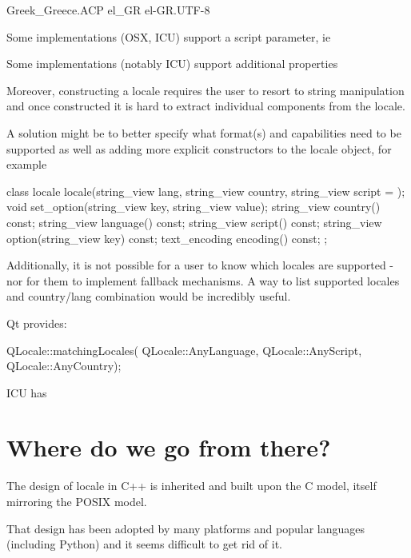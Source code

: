 \documentclass{wg21}
\begin{document}
\begin{codeblock}
Greek_Greece.ACP
el_GR
el-GR.UTF-8
\end{codeblock}

Some implementations (OSX, ICU) support a script parameter, ie 

Some implementations (notably ICU) support additional properties 


Moreover, constructing a locale requires the user to resort to string manipulation and once constructed it is hard to extract individual components from the locale.

A solution might be to better specify what format(s) and capabilities need to be supported as well as adding more explicit constructors to the locale object, for example


\begin{codeblock}

class locale {
    locale(string_view lang, string_view country, string_view script = {});
    void set_option(string_view key, string_view value);
    string_view country() const;
    string_view language() const;
    string_view script() const;
    string_view option(string_view key) const;
    text_encoding encoding() const;
};

\end{codeblock}

Additionally, it is not possible for a user to know which locales are supported - nor for them to implement fallback mechanisms.
A way to list supported locales and country/lang combination would be incredibly useful. 

Qt provides:

\begin{codeblock}
    QLocale::matchingLocales( QLocale::AnyLanguage, QLocale::AnyScript, QLocale::AnyCountry);
\end{codeblock}

ICU has 


\section{Where do we go from there?}

The design of locale in C++ is inherited and built upon the C model, itself mirroring the POSIX model.

That design has been adopted by many platforms and popular languages (including Python) and it seems difficult to get rid of it.
\end{document}
